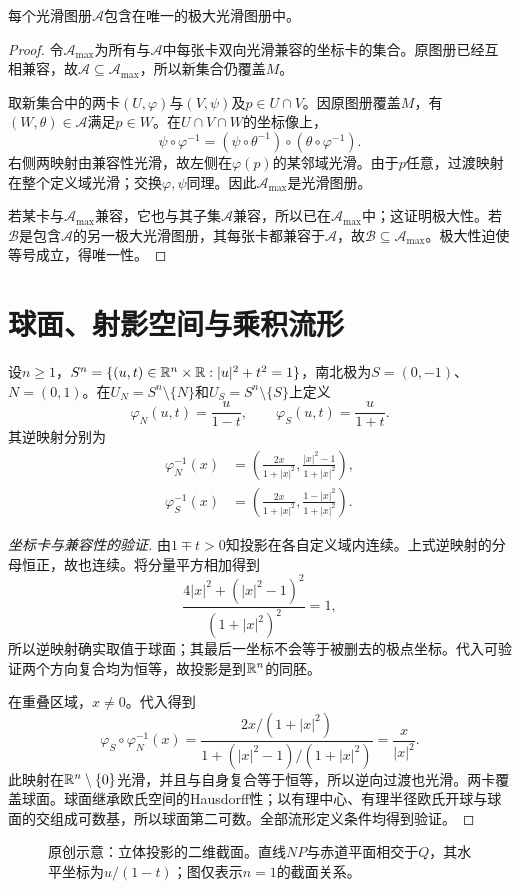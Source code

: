 \begin{theorem}[兼容图册的极大扩充唯一]
每个光滑图册$\mathcal A$包含在唯一的极大光滑图册中。
\end{theorem}
\begin{proof}
令$\mathcal A_{\max}$为所有与$\mathcal A$中每张卡双向光滑兼容的坐标卡的集合。原图册已经互相兼容，故$\mathcal A\subseteq\mathcal A_{\max}$，所以新集合仍覆盖$M$。

取新集合中的两卡$(U,\varphi)$与$(V,\psi)$及$p\in U\cap V$。因原图册覆盖$M$，有$(W,\theta)\in\mathcal A$满足$p\in W$。在$U\cap V\cap W$的坐标像上，
\[
\psi\circ\varphi^{-1}=(\psi\circ\theta^{-1})\circ(\theta\circ\varphi^{-1}).
\]
右侧两映射由兼容性光滑，故左侧在$\varphi(p)$的某邻域光滑。由于$p$任意，过渡映射在整个定义域光滑；交换$\varphi,\psi$同理。因此$\mathcal A_{\max}$是光滑图册。

若某卡与$\mathcal A_{\max}$兼容，它也与其子集$\mathcal A$兼容，所以已在$\mathcal A_{\max}$中；这证明极大性。若$\mathcal B$是包含$\mathcal A$的另一极大光滑图册，其每张卡都兼容于$\mathcal A$，故$\mathcal B\subseteq\mathcal A_{\max}$。极大性迫使等号成立，得唯一性。
\end{proof}



\section{球面、射影空间与乘积流形}
\begin{example}[球面的两张立体投影卡]
设$n\geq1$，$S^n=\{(u,t)\in\mathbb{R}^n\times\mathbb{R}:|u|^2+t^2=1\}$，南北极为$S=(0,-1)$、$N=(0,1)$。在$U_N=S^n\setminus\{N\}$和$U_S=S^n\setminus\{S\}$上定义
\[
\varphi_N(u,t)=\frac{u}{1-t},\qquad
\varphi_S(u,t)=\frac{u}{1+t}.
\]
其逆映射分别为
\begin{align*}
\varphi_N^{-1}(x)&=\left(\frac{2x}{1+|x|^2},\frac{|x|^2-1}{1+|x|^2}\right),\\
\varphi_S^{-1}(x)&=\left(\frac{2x}{1+|x|^2},\frac{1-|x|^2}{1+|x|^2}\right).
\end{align*}
\end{example}
\begin{proof}[坐标卡与兼容性的验证]
由$1\mp t>0$知投影在各自定义域内连续。上式逆映射的分母恒正，故也连续。将分量平方相加得到
\[
\frac{4|x|^2+(|x|^2-1)^2}{(1+|x|^2)^2}=1,
\]
所以逆映射确实取值于球面；其最后一坐标不会等于被删去的极点坐标。代入可验证两个方向复合均为恒等，故投影是到$\mathbb{R}^n$的同胚。

在重叠区域，$x\ne0$。代入得到
\[
\varphi_S\circ\varphi_N^{-1}(x)
=\frac{2x/(1+|x|^2)}{1+(|x|^2-1)/(1+|x|^2)}
=\frac{x}{|x|^2}.
\]
此映射在$\mathbb{R}^n\setminus\{0\}$光滑，并且与自身复合等于恒等，所以逆向过渡也光滑。两卡覆盖球面。球面继承欧氏空间的Hausdorff性；以有理中心、有理半径欧氏开球与球面的交组成可数基，所以球面第二可数。全部流形定义条件均得到验证。
\end{proof}
\begin{figure}[htbp]
\centering

\caption{原创示意：立体投影的二维截面。直线$NP$与赤道平面相交于$Q$，其水平坐标为$u/(1-t)$；图仅表示$n=1$的截面关系。}
\label{fig:stereographic}
\end{figure}

